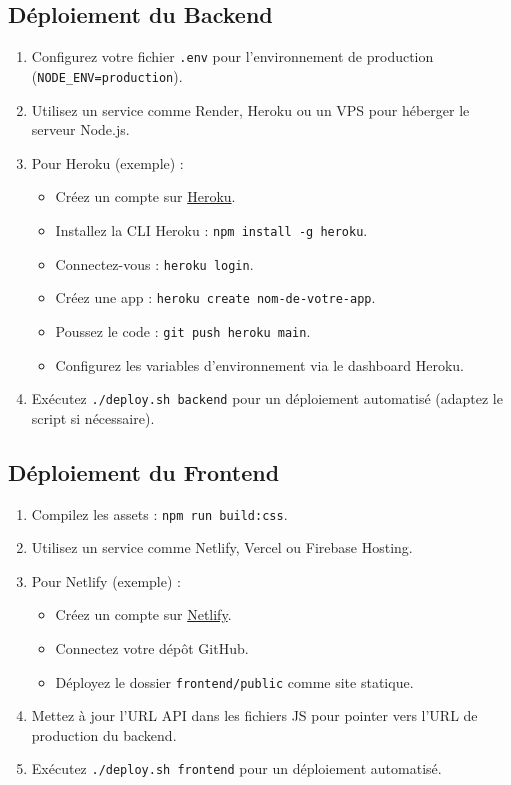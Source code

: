 \documentclass[12pt, a4paper]{article}
\begin{document}
\subsection{Déploiement du Backend}
\begin{stepbox}
\begin{enumerate}
  \item Configurez votre fichier \texttt{.env} pour l'environnement de production (\texttt{NODE_ENV=production}).
  \item Utilisez un service comme Render, Heroku ou un VPS pour héberger le serveur Node.js.
  \item Pour Heroku (exemple) :
    \begin{itemize}
      \item Créez un compte sur \href{https://heroku.com}{Heroku}.
      \item Installez la CLI Heroku : \texttt{npm install -g heroku}.
      \item Connectez-vous : \texttt{heroku login}.
      \item Créez une app : \texttt{heroku create nom-de-votre-app}.
      \item Poussez le code : \texttt{git push heroku main}.
      \item Configurez les variables d'environnement via le dashboard Heroku.
    \end{itemize}
  \item Exécutez \texttt{./deploy.sh backend} pour un déploiement automatisé (adaptez le script si nécessaire).
\end{enumerate}
\end{stepbox}

\subsection{Déploiement du Frontend}
\begin{stepbox}
\begin{enumerate}
  \item Compilez les assets : \texttt{npm run build:css}.
  \item Utilisez un service comme Netlify, Vercel ou Firebase Hosting.
  \item Pour Netlify (exemple) :
    \begin{itemize}
      \item Créez un compte sur \href{https://netlify.com}{Netlify}.
      \item Connectez votre dépôt GitHub.
      \item Déployez le dossier \texttt{frontend/public} comme site statique.
    \end{itemize}
  \item Mettez à jour l'URL API dans les fichiers JS pour pointer vers l'URL de production du backend.
  \item Exécutez \texttt{./deploy.sh frontend} pour un déploiement automatisé.
\end{enumerate}
\end{stepbox}
\end{document}
